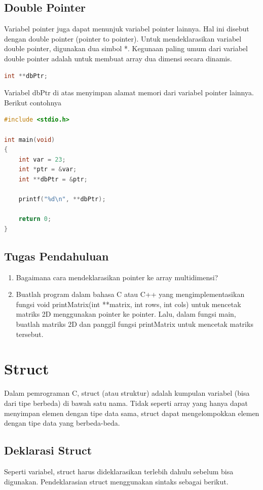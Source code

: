 \subsection{Double Pointer}
Variabel pointer juga dapat menunjuk variabel pointer lainnya. 
Hal ini disebut dengan double pointer (pointer to pointer). 
Untuk mendeklarasikan variabel double pointer, digunakan dua simbol *. 
Kegunaan paling umum dari variabel double pointer adalah untuk membuat array dua dimensi secara dinamis.
\begin{lstlisting}[language=c]
    int **dbPtr;
\end{lstlisting}
Variabel dbPtr di atas menyimpan alamat memori dari variabel pointer lainnya. \\
Berikut contohnya
\begin{lstlisting}[language=c,  caption={Contoh Double Pointer}]
#include <stdio.h>

int main(void)
{
    int var = 23;
    int *ptr = &var;
    int **dbPtr = &ptr;

    printf("%d\n", **dbPtr);
        
    return 0;
}
\end{lstlisting}

\subsection{Tugas Pendahuluan}
\begin{enumerate}
   \item Bagaimana cara mendeklarasikan pointer ke array multidimensi?
   \item Buatlah program dalam bahasa C atau C++ yang mengimplementasikan 
   fungsi void printMatrix(int **matrix, int rows, int cols) untuk mencetak matriks 2D menggunakan pointer ke pointer. Lalu, dalam fungsi main, 
   buatlah matriks 2D dan panggil fungsi printMatrix untuk mencetak matriks tersebut.
\end{enumerate}

\section{Struct}
Dalam pemrograman C, struct (atau struktur) adalah kumpulan variabel (bisa dari tipe berbeda) di bawah satu nama. 
Tidak seperti array yang hanya dapat menyimpan elemen dengan tipe data sama, 
struct dapat mengelompokkan elemen dengan tipe data yang berbeda-beda.


\subsection{Deklarasi Struct}
Seperti variabel, struct harus dideklarasikan terlebih dahulu sebelum bisa digunakan. Pendeklarasian struct menggunakan sintaks sebagai berikut.


